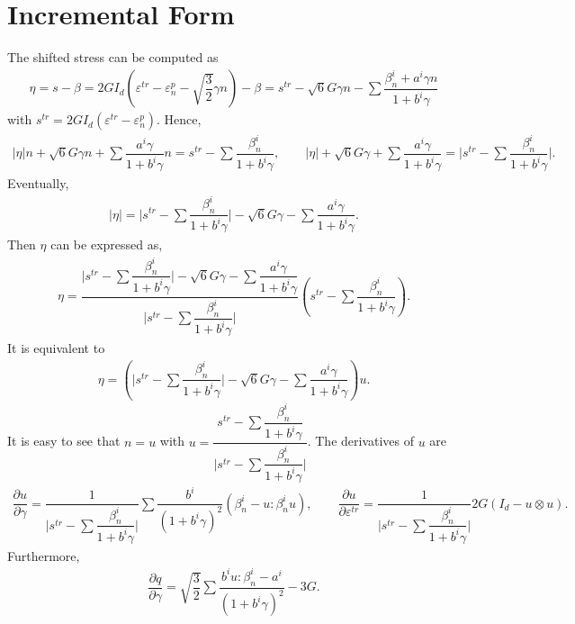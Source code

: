 \documentclass[a4paper,10pt,fleqn]{article}
\newcommand*{\pfrac}[2]{\dfrac{\partial#1}{\partial#2}}
\begin{document}
\section{Incremental Form}
The shifted stress can be computed as
\begin{gather}
\eta=s-\beta=2GI_d\left(\varepsilon^{tr}-\varepsilon^p_n-\sqrt{\dfrac{3}{2}}\gamma{}n\right)-\beta=s^{tr}-\sqrt{6}G\gamma{}n-\sum\dfrac{\beta_n^i+a^i\gamma{}n}{1+b^i\gamma}
\end{gather}
with $s^{tr}=2GI_d\left(\varepsilon^{tr}-\varepsilon^p_n\right)$. Hence,
\begin{gather*}
\Big|\eta\Big|n+\sqrt{6}G\gamma{}n+\sum\dfrac{a^i\gamma}{1+b^i\gamma}n=s^{tr}-\sum\dfrac{\beta_n^i}{1+b^i\gamma},\qquad
\Big|\eta\Big|+\sqrt{6}G\gamma+\sum\dfrac{a^i\gamma}{1+b^i\gamma}=\Big|s^{tr}-\sum\dfrac{\beta_n^i}{1+b^i\gamma}\Big|.
\end{gather*}
Eventually,
\begin{gather}
\Big|\eta\Big|=\Big|s^{tr}-\sum\dfrac{\beta_n^i}{1+b^i\gamma}\Big|-\sqrt{6}G\gamma-\sum\dfrac{a^i\gamma}{1+b^i\gamma}.
\end{gather}
Then $\eta$ can be expressed as,
\begin{gather*}
\eta=\dfrac{\Big|s^{tr}-\sum\dfrac{\beta_n^i}{1+b^i\gamma}\Big|-\sqrt{6}G\gamma-\sum\dfrac{a^i\gamma}{1+b^i\gamma}}{\Big|s^{tr}-\sum\dfrac{\beta_n^i}{1+b^i\gamma}\Big|}\left(s^{tr}-\sum\dfrac{\beta_n^i}{1+b^i\gamma}\right).
\end{gather*}
It is equivalent to
\begin{gather*}
\eta=\left(\Big|s^{tr}-\sum\dfrac{\beta_n^i}{1+b^i\gamma}\Big|-\sqrt{6}G\gamma-\sum\dfrac{a^i\gamma}{1+b^i\gamma}\right)u.
\end{gather*}
It is easy to see that $n=u$ with $\displaystyle{}u=\dfrac{s^{tr}-\sum\dfrac{\beta_n^i}{1+b^i\gamma}}{\Big|s^{tr}-\sum\dfrac{\beta_n^i}{1+b^i\gamma}\Big|}$. The derivatives of $u$ are
\begin{gather}
\pfrac{u}{\gamma}=\dfrac{1}{\Big|s^{tr}-\sum\dfrac{\beta_n^i}{1+b^i\gamma}\Big|}\sum\dfrac{b^i}{(1+b^i\gamma)^2}\left(\beta_n^i-u:\beta_n^iu\right),\qquad
\pfrac{u}{\varepsilon^{tr}}=\dfrac{1}{\Big|s^{tr}-\sum\dfrac{\beta_n^i}{1+b^i\gamma}\Big|}2G\left(I_d-u\otimes{}u\right).
\end{gather}
Furthermore,
\begin{gather}
\pfrac{q}{\gamma}=\sqrt{\dfrac{3}{2}}\sum\dfrac{b^iu:\beta_n^i-a^i}{(1+b^i\gamma)^2}-3G.
\end{gather}
\end{document}
